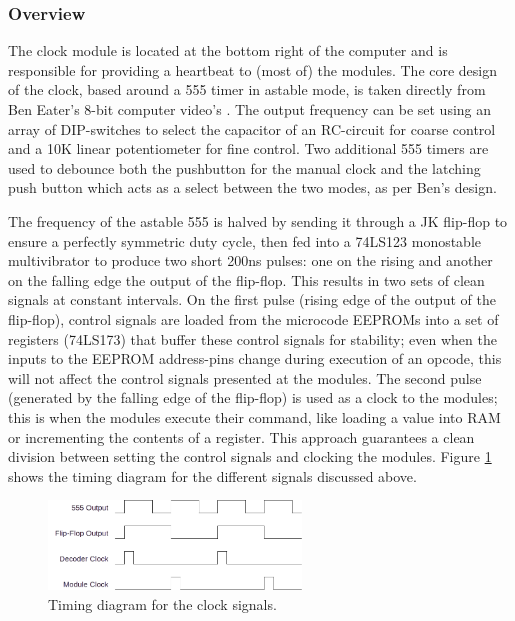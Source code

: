 \subsubsection{Overview}
The clock module is located at the bottom right of the computer and is responsible for providing a heartbeat to (most of) the modules. The core design of the clock, based around a 555 timer in astable mode, is taken directly from Ben Eater's 8-bit computer video's \cite{beneater}. The output frequency can be set using an array of DIP-switches to select the capacitor of an RC-circuit for coarse control and a 10K linear potentiometer for fine control. Two additional 555 timers are used to debounce both the pushbutton for the manual clock and the latching push button which acts as a select between the two modes, as per Ben's design. 

The frequency of the astable 555 is halved by sending it through a JK flip-flop to ensure a perfectly symmetric duty cycle, then fed into a 74LS123 monostable multivibrator to produce two short 200ns pulses: one on the rising and another on the falling edge the output of the flip-flop. This results in two sets of clean signals at constant intervals. On the first pulse (rising edge of the output of the flip-flop), control signals are loaded from the microcode EEPROMs into a set of registers (74LS173) that buffer these control signals for stability; even when the inputs to the EEPROM address-pins change during execution of an opcode, this will not affect the control signals presented at the modules. The second pulse (generated by the falling edge of the flip-flop) is used as a clock to the modules; this is when the modules execute their command, like loading a value into RAM or incrementing the contents of a register. This approach guarantees a clean division between setting the control signals and clocking the modules. Figure \ref{fig:clocktiming} shows the timing diagram for the different signals discussed above.

\begin{figure}[H]
  \centering
  \includegraphics[width=0.6\textwidth]{img/clocktiming}
  \caption{Timing diagram for the clock signals.}
  \label{fig:clocktiming}
\end{figure}


